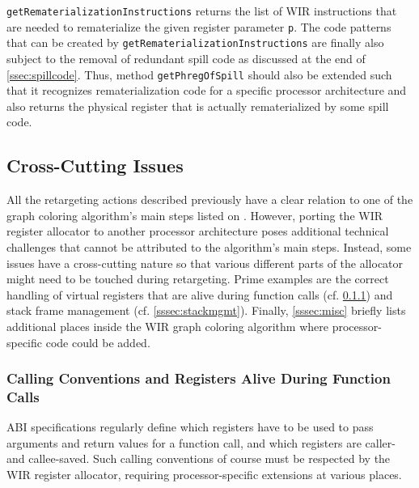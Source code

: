 \texttt{getRematerializationInstructions} returns the list of \gls{WIR} instructions that are needed to rematerialize the given register parameter \texttt{p}.
The code patterns that can be created by \texttt{getRematerializationInstructions} are finally also subject to the removal of redundant spill code as discussed at the end of \cref{ssec:spillcode}.
Thus, method \texttt{getPhregOfSpill} should also be extended such that it recognizes rematerialization code for a specific processor architecture and also returns the physical register that is actually rematerialized by some spill code.


\subsection{Cross-Cutting Issues}
\label{ssec:crosscutting}

All the retargeting actions described previously have a clear relation to one of the graph coloring algorithm's main steps listed on .
However, porting the \gls{WIR} register allocator to another processor architecture poses additional technical challenges that cannot be attributed to the algorithm's main steps.
Instead, some issues have a cross-cutting nature so that various different parts of the allocator might need to be touched during retargeting.
Prime examples are the correct handling of virtual registers that are alive during function calls (cf. \cref{sssec:vregscalls}) and stack frame management (cf. \cref{sssec:stackmgmt}).
Finally, \cref{sssec:misc} briefly lists additional places inside the \gls{WIR} graph coloring algorithm where processor-specific code could be added.


\subsubsection{Calling Conventions and Registers Alive During Function Calls}
\label{sssec:vregscalls}

\gls{ABI} specifications regularly define which registers have to be used to pass arguments and return values for a function call, and which registers are caller- and callee-saved.
Such calling conventions of course must be respected by the \gls{WIR} register allocator, requiring processor-specific extensions at various places.

